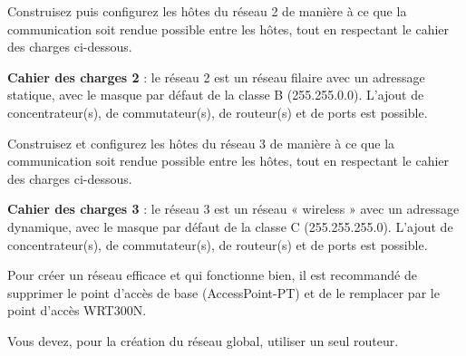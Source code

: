 \documentclass[
  french,
  10pt,
  a4paper,
]{scrartcl}
\begin{document}
\begin{tcolorbox}[enhanced jigsaw, arc=.35mm, bottomrule=.15mm, bottomtitle=1mm, breakable, colback=white, colbacktitle=quarto-callout-note-color!10!white, colframe=quarto-callout-note-color-frame, coltitle=black, left=2mm, leftrule=.75mm, opacityback=0, opacitybacktitle=0.6, rightrule=.15mm, title=\textcolor{quarto-callout-note-color}{\faInfo}\hspace{0.5em}{Question 6}, titlerule=0mm, toprule=.15mm, toptitle=1mm]

Construisez puis configurez les hôtes du réseau 2 de manière à ce que la
communication soit rendue possible entre les hôtes, tout en respectant
le cahier des charges ci-dessous.

\textbf{Cahier des charges 2} : le réseau 2 est un réseau filaire avec
un adressage statique, avec le masque par défaut de la classe B
(255.255.0.0). L'ajout de concentrateur(s), de commutateur(s), de
routeur(s) et de ports est possible.

\end{tcolorbox}

\begin{tcolorbox}[enhanced jigsaw, arc=.35mm, bottomrule=.15mm, bottomtitle=1mm, breakable, colback=white, colbacktitle=quarto-callout-note-color!10!white, colframe=quarto-callout-note-color-frame, coltitle=black, left=2mm, leftrule=.75mm, opacityback=0, opacitybacktitle=0.6, rightrule=.15mm, title=\textcolor{quarto-callout-note-color}{\faInfo}\hspace{0.5em}{Question 7}, titlerule=0mm, toprule=.15mm, toptitle=1mm]

Construisez et configurez les hôtes du réseau 3 de manière à ce que la
communication soit rendue possible entre les hôtes, tout en respectant
le cahier des charges ci-dessous.

\textbf{Cahier des charges 3} : le réseau 3 est un réseau « wireless »
avec un adressage dynamique, avec le masque par défaut de la classe C
(255.255.255.0). L'ajout de concentrateur(s), de commutateur(s), de
routeur(s) et de ports est possible.

\end{tcolorbox}

\begin{tcolorbox}[enhanced jigsaw, arc=.35mm, bottomrule=.15mm, bottomtitle=1mm, breakable, colback=white, colbacktitle=quarto-callout-warning-color!10!white, colframe=quarto-callout-warning-color-frame, coltitle=black, left=2mm, leftrule=.75mm, opacityback=0, opacitybacktitle=0.6, rightrule=.15mm, title=\textcolor{quarto-callout-warning-color}{\faExclamationTriangle}\hspace{0.5em}{Attention}, titlerule=0mm, toprule=.15mm, toptitle=1mm]

Pour créer un réseau efficace et qui fonctionne bien, il est recommandé
de supprimer le point d'accès de base (AccessPoint-PT) et de le
remplacer par le point d'accès WRT300N.

Vous devez, pour la création du réseau global, utiliser un seul routeur.

\end{tcolorbox}
\end{document}
